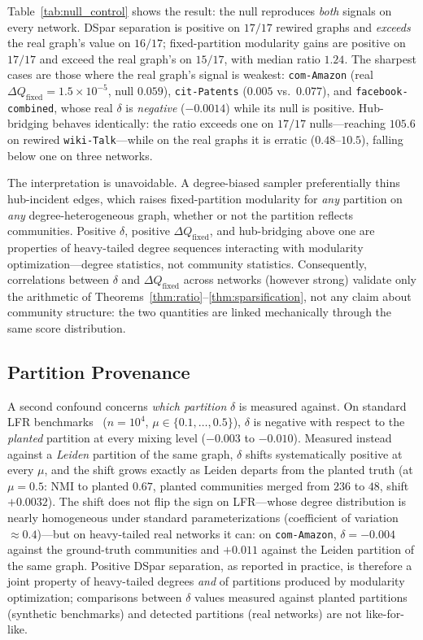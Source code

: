 

Table~\ref{tab:null_control} shows the result: the null reproduces \emph{both} signals on every network.
DSpar separation is positive on $17/17$ rewired graphs and \emph{exceeds} the real graph's value on $16/17$; fixed-partition modularity gains are positive on $17/17$ and exceed the real graph's on $15/17$, with median ratio $1.24$.
The sharpest cases are those where the real graph's signal is weakest: \texttt{com-Amazon} (real $\Delta Q_{\mathrm{fixed}} = 1.5\times10^{-5}$, null $0.059$), \texttt{cit-Patents} ($0.005$ vs.\ $0.077$), and \texttt{facebook-combined}, whose real $\delta$ is \emph{negative} ($-0.0014$) while its null is positive.
Hub-bridging behaves identically: the ratio exceeds one on $17/17$ nulls---reaching $105.6$ on rewired \texttt{wiki-Talk}---while on the real graphs it is erratic ($0.48$--$10.5$), falling below one on three networks.

The interpretation is unavoidable.
A degree-biased sampler preferentially thins hub-incident edges, which raises fixed-partition modularity for \emph{any} partition on \emph{any} degree-heterogeneous graph, whether or not the partition reflects communities.
Positive $\delta$, positive $\Delta Q_{\mathrm{fixed}}$, and hub-bridging above one are properties of heavy-tailed degree sequences interacting with modularity optimization---degree statistics, not community statistics.
Consequently, correlations between $\delta$ and $\Delta Q_{\mathrm{fixed}}$ across networks (however strong) validate only the arithmetic of Theorems~\ref{thm:ratio}--\ref{thm:sparsification}, not any claim about community structure: the two quantities are linked mechanically through the same score distribution.

\subsection{Partition Provenance}
\label{sec:mech-provenance}

A second confound concerns \emph{which partition} $\delta$ is measured against.
On standard LFR benchmarks~\cite{lancichinetti2008benchmark} ($n = 10^4$, $\mu \in \{0.1,\dots,0.5\}$), $\delta$ is negative with respect to the \emph{planted} partition at every mixing level ($-0.003$ to $-0.010$).
Measured instead against a \emph{Leiden} partition of the same graph, $\delta$ shifts systematically positive at every $\mu$, and the shift grows exactly as Leiden departs from the planted truth (at $\mu = 0.5$: NMI to planted $0.67$, planted communities merged from $236$ to $48$, shift $+0.0032$).
The shift does not flip the sign on LFR---whose degree distribution is nearly homogeneous under standard parameterizations (coefficient of variation $\approx 0.4$)---but on heavy-tailed real networks it can: on \texttt{com-Amazon}, $\delta = -0.004$ against the ground-truth communities and $+0.011$ against the Leiden partition of the same graph.
Positive DSpar separation, as reported in practice, is therefore a joint property of heavy-tailed degrees \emph{and} of partitions produced by modularity optimization; comparisons between $\delta$ values measured against planted partitions (synthetic benchmarks) and detected partitions (real networks) are not like-for-like.

